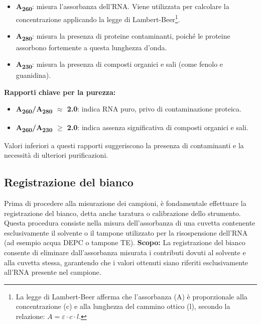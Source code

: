 \begin{itemize}
  \item \textbf{A\textsubscript{260}}: misura l’assorbanza dell’RNA. Viene utilizzata per calcolare la concentrazione applicando la legge di Lambert-Beer\footnote{La legge di Lambert-Beer afferma che l’assorbanza (A) è proporzionale alla concentrazione (c) e alla lunghezza del cammino ottico (l), secondo la relazione: $A = \varepsilon \cdot c \cdot l$.}.

  \item \textbf{A\textsubscript{280}}: misura la presenza di proteine contaminanti, poiché le proteine assorbono fortemente a questa lunghezza d’onda.
  \item \textbf{A\textsubscript{230}}: misura la presenza di composti organici e sali (come fenolo e guanidina).
\end{itemize}

\textbf{Rapporti chiave per la purezza:}
\begin{itemize}
  \item \textbf{A\textsubscript{260}/A\textsubscript{280} $\approx$ 2.0}: indica RNA puro, privo di contaminazione proteica.
  \item \textbf{A\textsubscript{260}/A\textsubscript{230} $\geq$ 2.0}: indica assenza significativa di composti organici e sali.
\end{itemize}

Valori inferiori a questi rapporti suggeriscono la presenza di contaminanti e la necessità di ulteriori purificazioni.

\begin{noSplitBlock}
  \subsection{Registrazione del bianco}

Prima di procedere alla misurazione dei campioni, è fondamentale effettuare la registrazione del bianco, detta anche taratura o calibrazione dello strumento. Questa procedura consiste nella misura dell’assorbanza di una cuvetta contenente esclusivamente il solvente o il tampone utilizzato per la risospensione dell’RNA (ad esempio acqua DEPC o tampone TE).
\newline
\newline
\textbf{Scopo:}  
La registrazione del bianco consente di eliminare dall’assorbanza misurata i contributi dovuti al solvente e alla cuvetta stessa, garantendo che i valori ottenuti siano riferiti esclusivamente all’RNA presente nel campione.

\end{noSplitBlock}
\newpage